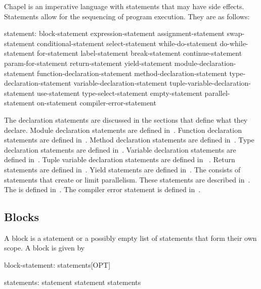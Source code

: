 \label{Statements}


Chapel is an imperative language with statements that may have side
effects.  Statements allow for the sequencing of program execution.
They are as follows:
\begin{syntax}
statement:
  block-statement
  expression-statement
  assignment-statement
  swap-statement
  conditional-statement
  select-statement
  while-do-statement
  do-while-statement
  for-statement
  label-statement
  break-statement
  continue-statement
  param-for-statement
  return-statement
  yield-statement
  module-declaration-statement
  function-declaration-statement
  method-declaration-statement
  type-declaration-statement
  variable-declaration-statement
  tuple-variable-declaration-statement
  use-statement
  type-select-statement
  empty-statement
  parallel-statement
  on-statement
  compiler-error-statement
\end{syntax}

The declaration statements are discussed in the sections that define
what they declare.  Module declaration statements are defined
in~.  Function declaration statements are defined
in~.  Method declaration statements are defined
in~.  Type declaration statements are defined
in~.  Variable declaration statements are defined
in~.  Tuple variable declaration statements are
defined in ~.  Return
statements are defined in~.  Yield
statements are defined in~.
The  consists of statements that create or
limit parallelism.  These statements are described
in~.  The  is
defined in~.  The compiler error statement is defined
in~.

\subsection{Blocks}
\label{Blocks}


A block is a statement or a possibly empty list of statements that
form their own scope.  A block is given by
\begin{syntax}
block-statement:
  { statements[OPT] }
  { }

statements:
  statement
  statement statements
\end{syntax}

